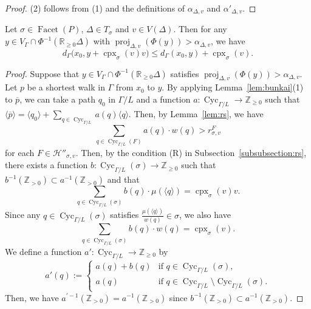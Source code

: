 \begin{proof}
(2) follows from (1) and the definitions of $\alpha _{\Delta, v}$ and $\alpha' _{\Delta, v}$. 
\end{proof}

\begin{thm}\label{thm:mod}
Let $\sigma \in \operatorname{Facet}(P)$, $\Delta \in T_{\sigma}$ and $v \in V(\Delta)$. 
Then for any $y \in V_{\Gamma} \cap \Phi ^{-1}( \mathbb{R}_{\ge 0} \Delta)$ with $\operatorname{proj}_{\Delta, v} (\Phi(y)) > \alpha _{\Delta, v}$, we have  
\[
d_{\Gamma}\bigl( x_0, y + \operatorname{cpx}_{\sigma}(v)v \bigr) 
\le d_{\Gamma}( x_0, y) + \operatorname{cpx}_{\sigma}(v).
\]
\end{thm}
\begin{proof}
Suppose that  $y \in V_{\Gamma} \cap \Phi ^{-1}( \mathbb{R}_{\ge 0} \Delta)$ satisfies $\operatorname{proj}_{\Delta, v} (\Phi(y)) > \alpha _{\Delta, v}$. 
Let $p$ be a shortest walk in $\Gamma$ from $x_0$ to $y$. 
By applying Lemma~\ref{lem:bunkai}(1) to $\overline{p}$, 
we can take a path $q_0$ in $\Gamma /L$ and a function $a : \operatorname{Cyc}_{\Gamma /L} \to \mathbb{Z}_{\ge 0}$ 
such that $\langle \overline{p} \rangle = \langle q_0 \rangle + \sum _{q \in \operatorname{Cyc}_{\Gamma /L}} a(q) \langle q \rangle$. 
Then, by Lemma~\ref{lem:rs}, we have 
\[
\sum _{q \in \operatorname{Cyc}_{\Gamma /L}(F)} a(q) \cdot w(q) > r^{F} _{\sigma, v}
\]
for each $F \in \mathcal{H}'' _{\sigma, v}$. 
Then, by the condition (R) in Subsection~\ref{subsubsection:rs}, 
there exists a function $b: \operatorname{Cyc}_{\Gamma /L}(\sigma) \to \mathbb{Z}_{\ge 0}$ such that 
$b^{-1}(\mathbb{Z}_{>0}) \subset a^{-1}(\mathbb{Z}_{>0})$ and that 
\[
\sum _{q \in \operatorname{Cyc}_{\Gamma /L}(\sigma)} b(q) \cdot \mu(\langle q \rangle) = \operatorname{cpx}_{\sigma}(v) v.
\]
Since any $q \in \operatorname{Cyc}_{\Gamma /L}(\sigma)$ satisfies $\frac{\mu(\langle q \rangle)}{w(q)} \in \sigma$, 
we also have 
\[
\sum _{q \in \operatorname{Cyc}_{\Gamma /L}(\sigma)} b(q) \cdot w(q) = \operatorname{cpx}_{\sigma}(v). 
\]
We define a function $a' : \operatorname{Cyc}_{\Gamma /L} \to \mathbb{Z}_{\ge 0}$ by 
\[
a'(q) := 
\begin{cases}
a(q) + b(q) & \text{if $q \in \operatorname{Cyc}_{\Gamma /L}(\sigma)$,} \\
a(q)  & \text{if $q \in \operatorname{Cyc}_{\Gamma /L} \setminus \operatorname{Cyc}_{\Gamma /L}(\sigma)$}. 
\end{cases}
\]
Then, we have $a^{\prime -1}(\mathbb{Z}_{>0}) = a^{-1}(\mathbb{Z}_{>0})$ since $b^{-1}(\mathbb{Z}_{>0}) \subset a^{-1}(\mathbb{Z}_{>0})$. 

\end{proof}
